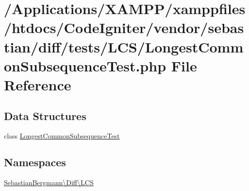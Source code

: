 \hypertarget{_longest_common_subsequence_test_8php}{}\section{/\+Applications/\+X\+A\+M\+P\+P/xamppfiles/htdocs/\+Code\+Igniter/vendor/sebastian/diff/tests/\+L\+C\+S/\+Longest\+Common\+Subsequence\+Test.php File Reference}
\label{_longest_common_subsequence_test_8php}
\subsection*{Data Structures}
\begin{DoxyCompactItemize}
\item 
class \mbox{\hyperlink{class_sebastian_bergmann_1_1_diff_1_1_l_c_s_1_1_longest_common_subsequence_test}{Longest\+Common\+Subsequence\+Test}}
\end{DoxyCompactItemize}
\subsection*{Namespaces}
\begin{DoxyCompactItemize}
\item 
 \mbox{\hyperlink{namespace_sebastian_bergmann_1_1_diff_1_1_l_c_s}{Sebastian\+Bergmann\textbackslash{}\+Diff\textbackslash{}\+L\+CS}}
\end{DoxyCompactItemize}
